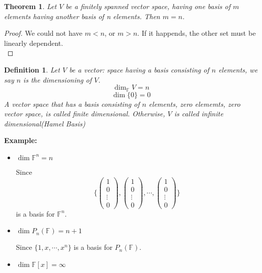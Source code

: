 \documentclass[12pt]{article}
\newtheorem{theorem}{Theorem}[subsection]
\newtheorem{definition}{Definition}[subsection]
\newcommand{\mF}{{\mathbb{F}}}
\begin{document}
	\begin{theorem}
		Let $V$ be a finitely spanned vector space, having one basis of 
		$m$ elements having another basis of n elements. 
		Then $m=n$. 
	\end{theorem}
	\begin{proof}
		We could not have $m<n$, or $m>n$. If it happends, the other set must
		be linearly dependent. \\
	\end{proof}

	\begin{definition}
		Let $V$ be a vector: space having a basis consisting of $n$ elements,
		we say $n$ is the dimensioning of $V$. 
		\[
			\dim _{\mF} V = n
		\]
		\[
			\dim\{0\} = 0
		\]
		A vector space that has a basis consisting of $n$ elements, zero 
		elememts, zero vector space, is called finite dimensional. 
		Otherwise, $V$ is called infinite dimensional(\textcolor{Periwinkle}
		{Hamel Basis})\\
	\end{definition}
	
	{\color{Brown}
	{
		\textbf{Example: }
		\begin{itemize}
			\item 
				$\dim \mF^n = n$
				
				Since 
				\[
					\bigg\{ 
					\begin{pmatrix}
							1\\
							0\\
							\vdots\\
							0
					\end{pmatrix}
					, 
					\begin{pmatrix}
							1\\
							0\\
							\vdots\\
							0
					\end{pmatrix}
					,
					\cdots,
					\begin{pmatrix}
							1\\
							0\\
							\vdots\\
							0
					\end{pmatrix}
					\bigg \}
				\]
				is a basis for $\mF^n$.

			\item 
				$\dim P_n(\mF) = n + 1$

			Since $\{1, x, \cdots, x^n\}$ is a basis for $P_n(\mF)$. 
			
		\item $\dim \mF[x] = \infty$ \\
		\end{itemize}
	}	
	}
	
\end{document}

